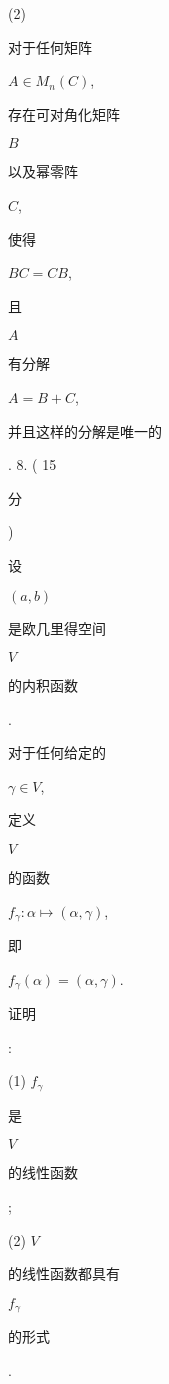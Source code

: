 \documentclass[10pt]{article}
\begin{document}
(2) \begin{CJK}{UTF8}{mj}对于任何矩阵\end{CJK} $A \in M_{n}(C)$, \begin{CJK}{UTF8}{mj}存在可对角化矩阵\end{CJK} $B$ \begin{CJK}{UTF8}{mj}以及幂零阵\end{CJK} $C$, \begin{CJK}{UTF8}{mj}使得\end{CJK} $B C=C B$, \begin{CJK}{UTF8}{mj}且\end{CJK} $A$ \begin{CJK}{UTF8}{mj}有分解\end{CJK} $A=B+C$, \begin{CJK}{UTF8}{mj}并且这样的分解是唯一的\end{CJK}. 8. ( 15 \begin{CJK}{UTF8}{mj}分\end{CJK}) \begin{CJK}{UTF8}{mj}设\end{CJK} $(a, b)$ \begin{CJK}{UTF8}{mj}是欧几里得空间\end{CJK} $V$ \begin{CJK}{UTF8}{mj}的内积函数\end{CJK}. \begin{CJK}{UTF8}{mj}对于任何给定的\end{CJK} $\gamma \in V$, \begin{CJK}{UTF8}{mj}定义\end{CJK} $V$ \begin{CJK}{UTF8}{mj}的函数\end{CJK} $f_{\gamma}: \alpha \mapsto(\alpha, \gamma)$, \begin{CJK}{UTF8}{mj}即\end{CJK} $f_{\gamma}(\alpha)=(\alpha, \gamma)$. \begin{CJK}{UTF8}{mj}证明\end{CJK}:

(1) $f_{\gamma}$ \begin{CJK}{UTF8}{mj}是\end{CJK} $V$ \begin{CJK}{UTF8}{mj}的线性函数\end{CJK};

(2) $V$ \begin{CJK}{UTF8}{mj}的线性函数都具有\end{CJK} $f_{\gamma}$ \begin{CJK}{UTF8}{mj}的形式\end{CJK}.
\end{document}

